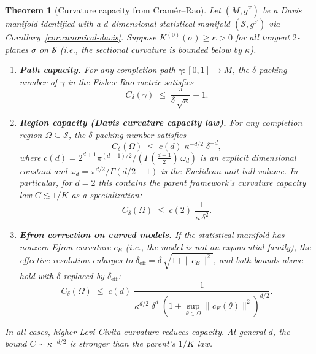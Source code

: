 \documentclass[11pt]{article}
\newcommand{\gF}{g^{\mathrm{F}}}
\newtheorem{theorem}{Theorem}
\theoremstyle{remark}
\begin{document}
\begin{theorem}[Curvature capacity from Cram\'er--Rao]
\label{thm:curvature-capacity}
Let $(M, \gF)$ be a Davis manifold identified with a $d$-dimensional
statistical manifold $(\mathcal{S}, \gF)$ via
Corollary~\ref{cor:canonical-davis}.  Suppose
$K^{(0)}(\sigma) \ge \kappa > 0$
for all tangent $2$-planes $\sigma$ on $\mathcal{S}$ (i.e., the sectional
curvature is bounded below by $\kappa$).

\begin{enumerate}[label=\textnormal{(\roman*)}, leftmargin=*]
  \item \textbf{Path capacity.}  For any completion path
  $\gamma : [0,1] \to M$, the
  $\delta$-packing number of $\gamma$ in the Fisher-Rao metric satisfies
  \begin{equation}\label{eq:capacity-path}
  C_\delta(\gamma) \;\le\;
  \frac{\pi}{\delta\,\sqrt{\kappa}} + 1.
  \end{equation}

  \item \textbf{Region capacity (Davis curvature capacity law).}
  For any completion region $\Omega \subseteq \mathcal{S}$, the
  $\delta$-packing number satisfies
  \begin{equation}\label{eq:capacity-region}
  C_\delta(\Omega) \;\le\;
  c(d)\;\kappa^{-d/2}\;\delta^{-d},
  \end{equation}
  where $c(d) = 2^{d+1}\pi^{(d+1)/2} /
  (\Gamma(\frac{d+1}{2})\,\omega_d)$ is an explicit dimensional constant
  and $\omega_d = \pi^{d/2}/\Gamma(d/2+1)$ is the Euclidean unit-ball
  volume.  In particular, for $d = 2$ this contains the parent framework's
  curvature capacity law $C \lesssim 1/K$ as a specialization:
  \begin{equation}\label{eq:capacity-law}
  C_\delta(\Omega) \;\le\;
  c(2)\;\frac{1}{\kappa\,\delta^2}.
  \end{equation}

  \item \textbf{Efron correction on curved models.}  If the statistical
  manifold has nonzero Efron curvature $c_E$ (i.e., the model is
  not an exponential family), the effective resolution enlarges to
  $\delta_{\mathrm{eff}} = \delta\,\sqrt{1 + \|c_E\|^2}$, and both
  bounds above hold with $\delta$ replaced by $\delta_{\mathrm{eff}}$:
  \begin{equation}\label{eq:capacity-efron}
  C_{\delta}(\Omega)
  \;\le\;
  c(d)\;\frac{1}
  {\kappa^{d/2}\;\delta^d\;
  (1 + \sup_{\theta \in \Omega} \|c_E(\theta)\|^2)^{d/2}}.
  \end{equation}
\end{enumerate}

In all cases, higher Levi-Civita curvature reduces capacity.  At general
$d$, the bound $C \sim \kappa^{-d/2}$ is \emph{stronger} than the parent's
$1/K$ law.
\end{theorem}
\end{document}
